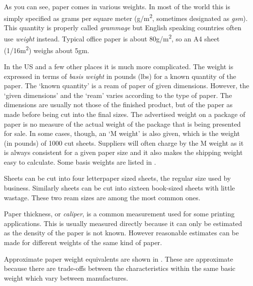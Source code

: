 \documentclass[10pt,a4paper,extrafontsizes]{memoir}
\newcommand*{\sqrd}[1]{#1\textsuperscript{2}}
\newcommand*{\gsm}{g/\sqrd{m}}
\newcommand*{\half}{\slashfrac{1}{2}}
\begin{document}
\begin{paracol}{2}
\switchEng
    As you can see, paper comes in various weights. In most of the world this
is simply specified as grams per square meter (\gsm, sometimes designated as
\emph{gsm}). This quantity is properly called \emph{grammage}
but English
speaking countries often use \emph{weight} instead. Typical office
paper is about 80\gsm, so an A4 sheet (1/16\sqrd{m}) weighs about 5gm.

    In the US and a few other places it is much more complicated. The
weight is expressed in terms of \emph{basis weight} 
in pounds (lbs) for a known quantity of the
paper. The `known quantity' is a ream of paper of given dimensions. However, 
the `given dimensions' and the `ream' varies according to the type of paper.
The dimensions are usually not those of the finished product, but of the paper
as made before being cut into the final sizes. 
The advertised weight on a package of paper is no measure of the actual 
weight of the package that is being presented for sale. 
In some cases, though, an `M weight' is also given, 
which is the weight (in
pounds) of 1000 cut sheets. Suppliers will often charge by the M weight as it
is always consistent for a given paper size and it also makes the shipping
weight easy to calculate. Some basis weights
are listed in .


    
    Sheets  can be cut into four \abybm{8\,\half}{11}{in}
letterpaper sized sheets, the regular size used by business. 
Similarly sheets  can be cut into sixteen
 book-sized sheets with little wastage. These two ream sizes
are among the most common ones.

    Paper thickness, or \emph{caliper}, is a common measurement
used for some printing applications. This is usually measured directly
because it can only be estimated as the density of the paper is not known.
However reasonable estimates can be made for different weights of
the same kind of paper.

    Approximate paper weight equivalents are shown in .
These are approximate because there are trade-offs between the characteristics
within the same basic weight which vary between manufactures.
\end{paracol}



\end{document}
